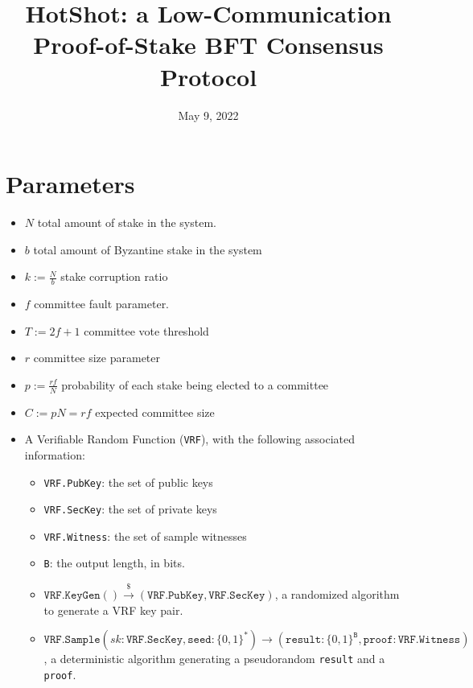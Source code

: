 \documentclass[11pt, oneside]{article}       %
\title{HotShot: a Low-Communication Proof-of-Stake BFT Consensus Protocol}
\date{May 9, 2022}                            %
\begin{document}
\maketitle

\section{Parameters}

\begin{itemize}

    \item \(N\) total amount of stake in the system.

    \item \(b\) total amount of Byzantine stake in the system

    \item \(k := \frac{N}{b}\) stake corruption ratio

    \item \(f\) committee fault parameter.

    \item \(T := 2f + 1\) committee vote threshold

    \item \(r\) committee size parameter

    \item \(p := \frac{rf}{N}\) probability of each stake being elected to a committee

    \item \(C := pN = rf\) expected committee size

\item A Verifiable Random Function (\texttt{VRF}), with the following associated
    information:

    \begin{itemize}
        \item \texttt{VRF.PubKey}:  the set of public keys

        \item \texttt{VRF.SecKey}:  the set of private keys
        \item \texttt{VRF.Witness}: the set of sample witnesses
        \item \texttt{B}: the output length, in bits.

        \item \(\texttt{VRF.KeyGen}() \xrightarrow{\$} (\texttt{VRF.PubKey},
            \texttt{VRF.SecKey})\), a randomized algorithm to generate a VRF key pair.

        \item \(\texttt{VRF.Sample}(sk: \texttt{VRF.SecKey}, \texttt{seed}:
            \{0,1\}^*) \to (\texttt{result}: \{0,1\}^\texttt{B},
            \texttt{proof}: \texttt{VRF.Witness})\), a deterministic algorithm
            generating a pseudorandom \texttt{result} and a \texttt{proof}.


\end{itemize}
\end{itemize}
\end{document}
